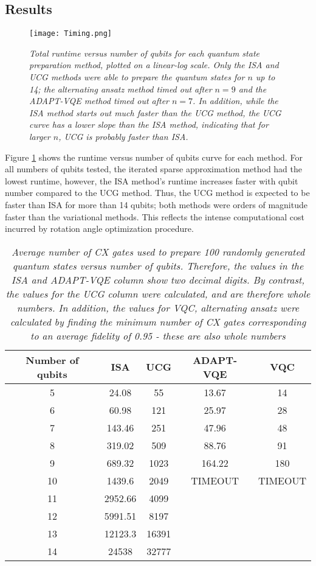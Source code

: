 \documentclass{article}
\begin{document}
\subsection{Results}
\begin{figure}[H]
\centering
\texttt{[image: Timing.png]}
\caption{\textit{Total runtime versus number of qubits for each quantum state
preparation method, plotted on a linear-log scale. Only the ISA and UCG methods
were able to prepare the quantum states for $n$ up to 14; the alternating
ansatz method timed out after $n = 9$ and the ADAPT-VQE method timed out after
$n = 7$. In addition, while the ISA method starts out much faster than the UCG
method, the UCG curve has a lower slope than the ISA method, indicating that for
larger $n$, UCG is probably faster than ISA.}}
\label{fig:timing_figure}
\end{figure}

Figure \ref{fig:timing_figure} shows the runtime versus number of qubits curve for each method. For 
all numbers of qubits tested, the iterated sparse approximation method had the 
lowest runtime, however, the ISA method's runtime increases faster with
qubit number compared to the UCG method. Thus, the UCG method is expected to
be faster than ISA for more than 14 qubits; both methods were orders of
magnitude faster than the variational methods. This reflects the intense
computational cost incurred by rotation angle optimization procedure.

\begin{table}
\begin{tabular}{c | c | c | c | c}
  \textbf{Number of qubits} & \textbf{ISA} & \textbf{UCG} & \textbf{ADAPT-VQE} & \textbf{VQC} \\
  \hline
  5 & 24.08 & 55 & 13.67 & 14 \\
  6 & 60.98 & 121 & 25.97 & 28 \\
  7 & 143.46 & 251 & 47.96 & 48 \\
  8 & 319.02 & 509 & 88.76 & 91 \\
  9 & 689.32 & 1023 & 164.22 & 180 \\
  10 & 1439.6 & 2049 & TIMEOUT & TIMEOUT \\
  11 & 2952.66 & 4099 & & \\
  12 & 5991.51 & 8197 & & \\
  13 & 12123.3 & 16391 & & \\
  14 & 24538 & 32777 & & \\
\end{tabular}
\caption{\textit{Average number of CX gates used to prepare 100
randomly generated quantum states versus number of qubits. Therefore, the values
in the ISA and ADAPT-VQE column show two decimal digits. By contrast, the values
for the UCG column were calculated, and are therefore whole numbers. In
addition, the values for VQC, alternating ansatz were calculated by finding
the minimum number of CX gates corresponding to an average fidelity of 0.95 - 
these are also whole numbers}}
\end{table}
\end{document}
